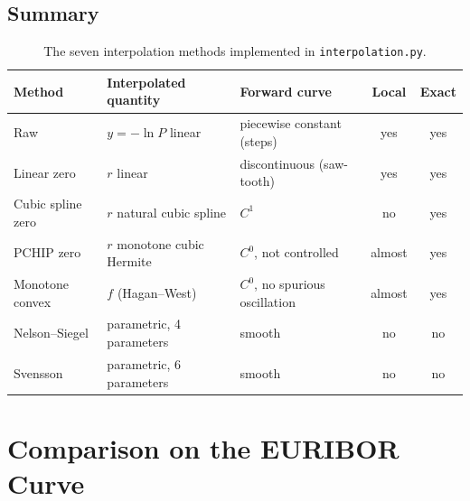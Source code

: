 \documentclass[11pt,a4paper]{article}
\theoremstyle{plain}
\theoremstyle{definition}
\begin{document}
\subsection{Summary}
\begin{table}[htbp]
\centering
\small
\begin{tabular}{@{}lllcc@{}}
\toprule
Method & Interpolated quantity & Forward curve & Local & Exact \\
\midrule
Raw & $y=-\ln P$ linear & piecewise constant (steps) & yes & yes \\
Linear zero & $r$ linear & discontinuous (saw-tooth) & yes & yes \\
Cubic spline zero & $r$ natural cubic spline & $C^1$ & no & yes \\
PCHIP zero & $r$ monotone cubic Hermite & $C^0$, not controlled & almost & yes \\
Monotone convex & $f$ (Hagan--West) & $C^0$, no spurious oscillation & almost & yes \\
Nelson--Siegel & parametric, 4 parameters & smooth & no & no \\
Svensson & parametric, 6 parameters & smooth & no & no \\
\bottomrule
\end{tabular}
\caption{The seven interpolation methods implemented in \texttt{interpolation.py}.}
\label{tab:methods}
\end{table}

\clearpage
\section{Comparison on the EURIBOR Curve}
\label{sec:comparison}
\end{document}
